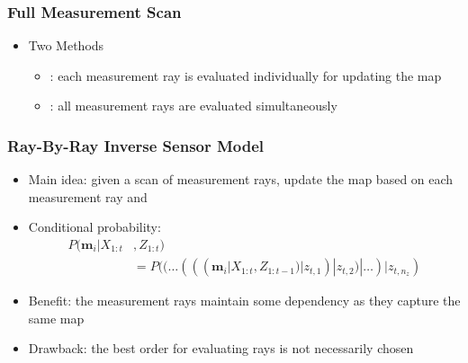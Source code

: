 \documentclass[11pt,professionalfonts,hyperref={pdftex,pdfpagemode=none,pdfstartview=FitH}]{beamer}
\renewcommand{\emph}[1]{\textit{\textbf{\color{blue}{#1}}}}
\begin{document}
\begin{frame}
\frametitle{Full Measurement Scan}

\begin{itemize}
	\item Two Methods
	\begin{itemize}
		\item \emph{Ray-By-Ray Inverse Sensor Model}: each measurement ray is evaluated individually for updating the map
		\item \emph{Synergistic Scan Inverse Sensor Model}: all measurement rays are evaluated simultaneously
	\end{itemize}
\end{itemize}

\end{frame}


\begin{frame}
\frametitle{Ray-By-Ray Inverse Sensor Model}

\begin{itemize}
	\item Main idea: given a scan of measurement rays, update the map based on each measurement ray \emph{individually} and \emph{sequentially}
	\item Conditional probability:
	\begin{align*}
		P(\mathbf{m}_i|X_{1:t}&,Z_{1:t})\nonumber\\&
		=P((\dots(((\mathbf{m}_i|X_{1:t},Z_{1:t-1})|z_{t,1})|z_{t,2})|\ldots)|z_{t,n_z})
	\end{align*}
	\item Benefit: the measurement rays maintain some dependency as they capture the same map
	\item Drawback: the best order for evaluating rays is not necessarily chosen
\end{itemize}

\end{frame}
\end{document}
